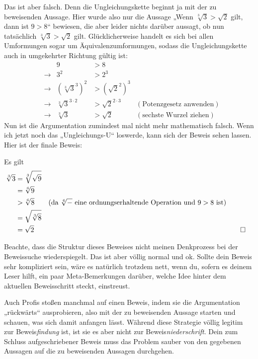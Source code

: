 \begin{bem}
    Das ist aber falsch. Denn die Ungleichungskette beginnt ja mit der zu beweisenden Aussage. Hier wurde also nur die Aussage „Wenn $\sqrt[3]{3} >\sqrt{2}$ gilt, dann ist $9>8$“ bewiesen, die aber leider nichts darüber aussagt, ob nun tatsächlich $\sqrt[3]{3} >\sqrt{2}$ gilt. Glücklicherweise handelt es sich bei allen Umformungen sogar um Äquivalenzumformungen, sodass die Ungleichungskette auch in umgekehrter Richtung gültig ist:
    \begin{align*}
        && 9 & > 8 \\
        & \to & 3^2 & > 2^3 \\
        & \to & (\sqrt[3]{3}^3)^2 & > (\sqrt{2}^2)^3 \\
        & \to& \sqrt[3]{3}^{3\cdot 2} & > \sqrt{2}^{2\cdot 3} & (\text{Potenzgesetz anwenden}) \\
        &\to &  \sqrt[3]{3}& >\sqrt{2}  & (\text{sechste Wurzel ziehen})
    \end{align*}
    Nun ist die Argumentation zumindest mal nicht mehr mathematisch falsch. Wenn ich jetzt noch das „Ungleichungs-U“ loswerde, kann sich der Beweis sehen lassen. Hier ist der finale Beweis:
    \begin{bew}
        Es gilt
        \begingroup
        \allowdisplaybreaks
        \begin{align*}
            \sqrt[3]{3} & = \sqrt[3]{\sqrt{9}} \\
            & = \sqrt[6]{9} \\
            & > \sqrt[6]{8} & (\text{da $\sqrt[6]{-}$ eine ordnungserhaltende Operation und $9>8$ ist}) \\
            & = \sqrt{\sqrt[3]{8}} \\
            & = \sqrt{2} && \qed
        \end{align*}
        \endgroup
    \end{bew}
    Beachte, dass die Struktur dieses Beweises nicht meinen Denkprozess bei der Beweissuche wiederspiegelt. Das ist aber völlig normal und ok. Sollte dein Beweis sehr kompliziert sein, wäre es natürlich trotzdem nett, wenn du, sofern es deinem Leser hilft, ein paar Meta-Bemerkungen darüber, welche Idee hinter dem aktuellen Beweisschritt steckt, einstreust.
    
    Auch Profis stoßen manchmal auf einen Beweis, indem sie die Argumentation „rückwärts“ ausprobieren, also mit der zu beweisenden Aussage starten und schauen, was sich damit anfangen lässt. Während diese Strategie völlig legitim zur Beweis\emph{findung} ist, ist sie es aber nicht zur Beweis\emph{niederschrift}. Dein zum Schluss aufgeschriebener Beweis muss das Problem sauber von den gegebenen Aussagen auf die zu beweisenden Aussagen durchgehen.
    

\end{bem}
